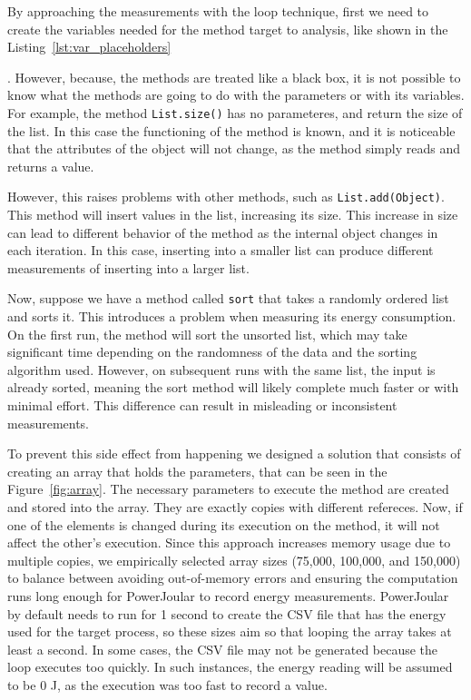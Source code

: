 By approaching the measurements with the loop technique, first we need to create the variables needed for the method target to analysis, like shown in the Listing~\ref{lst:var_placeholders} . However, because, the methods are treated like a black box, it is not possible to know what the methods are going to do with the parameters or with its variables.  For example, the method \texttt{List.size()} has no parameteres, and return the size of the list. In this case the functioning of the method is known, and it is noticeable that the attributes of the object will not change, as the method simply reads and returns a value.

However, this raises problems with other methods, such as \texttt{List.add(Object)}. This method will insert values in the list, increasing its size. This increase in size can lead to different behavior of the method as the internal object changes in each iteration. In this case, inserting into a smaller list can produce different measurements of inserting into a larger list.

Now, suppose we have a method called \texttt{sort} that takes a randomly ordered list and sorts it. This introduces a problem when measuring its energy consumption. On the first run, the method will sort the unsorted list, which may take significant time depending on the randomness of the data and the sorting algorithm used. However, on subsequent runs with the same list, the input is already sorted, meaning the sort method will likely complete much faster or with minimal effort. This difference can result in misleading or inconsistent measurements.

To prevent this side effect from happening we designed a solution that consists of creating an array that holds the parameters, that can be seen in the Figure~\ref{fig:array}. The necessary parameters to execute the method are created and stored into the array. They are exactly copies with different refereces. Now, if one of the elements is changed during its execution on the method, it will not affect the other's execution. Since this approach increases memory usage due to multiple copies, we empirically selected array sizes (75,000, 100,000, and 150,000) to balance between avoiding out-of-memory errors and ensuring the computation runs long enough for PowerJoular to record energy measurements. PowerJoular by default needs to run for 1 second to create the CSV file that has the energy used for the target process, so these sizes aim so that looping the array takes at least a second. In some cases, the CSV file may not be generated because the loop executes too quickly. In such instances, the energy reading will be assumed to be 0 J, as the execution was too fast to record a value.


